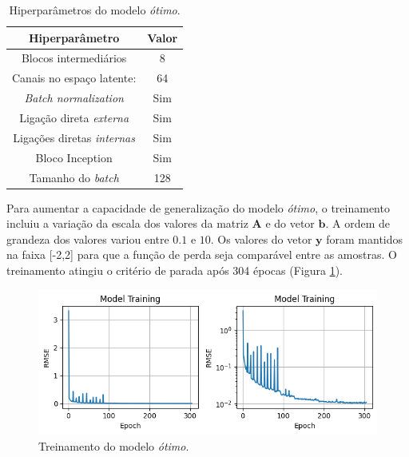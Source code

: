 \documentclass[final,5p]{elsarticle}
\numberwithin{equation}{section}
\begin{document}
    \begin{table}
    \begin{center}
        \caption{Hiperparâmetros do modelo \emph{ótimo}.}
        \label{tab:hiperparam}
        \vspace{5pt}
        \begin{tabular}{c c}
            \toprule
            \textbf{Hiperparâmetro} & \textbf{Valor} \\
            \midrule
            Blocos intermediários & 8 \\
            Canais no espaço latente: & 64 \\
            \emph{Batch normalization} & Sim \\
            Ligação direta \emph{externa} & Sim \\
            Ligações diretas \emph{internas} & Sim \\
            Bloco Inception & Sim \\
            Tamanho do \emph{batch} & 128 \\
            \bottomrule
        \end{tabular}
    \end{center}
    \end{table}

    Para aumentar a capacidade de generalização do modelo \emph{ótimo}, o treinamento incluiu a variação da escala dos valores da matriz $\textbf{A}$ e do vetor $\textbf{b}$. A ordem de grandeza dos valores variou entre $0.1$ e $10$. Os valores do vetor $\textbf{y}$ foram mantidos na faixa [-2,2] para que a função de perda seja comparável entre as amostras. O treinamento atingiu o critério de parada após 304 épocas (Figura \ref{fig:loss}).

    \begin{figure}[hbt!]
        \centering
        \includegraphics[width=0.95\columnwidth]{./fig/loss.png}
        \caption{Treinamento do modelo \emph{ótimo}.}\label{fig:loss}
    \end{figure}
\end{document}
